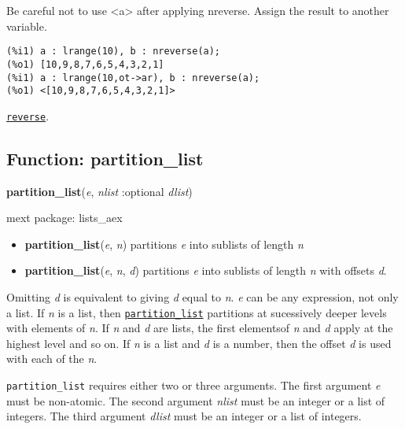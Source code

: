 \documentclass[]{article}
\begin{document}
\vspace{5 pt}


   Be careful not to use <a> after applying nreverse. Assign the result to 
   another variable. 

\begin{Verbatim}[frame=single]
(%i1) a : lrange(10), b : nreverse(a);
(%o1) [10,9,8,7,6,5,4,3,2,1]
(%i1) a : lrange(10,ot->ar), b : nreverse(a);
(%o1) <[10,9,8,7,6,5,4,3,2,1]>
\end{Verbatim}


 \hyperlink{reverse}{{\tt reverse}}.

\vspace{5 pt}


\subsection{Function: partition\_list\label{sec:partition_list}}
\hypertarget{partition_list}{}
{\bf partition\_list}({\it e}, {\it nlist} :optional {\it dlist})


\noindent mext package: lists\_aex



\vspace{5 pt}
\begin{itemize}
\item[] {\bf partition\_list}({\it e}, {\it n})
  partitions {\it e} into sublists of length {\it n} 

\item[] {\bf partition\_list}({\it e}, {\it n}, {\it d})
  partitions {\it e} into sublists of length {\it n} with offsets {\it d}. 

\end{itemize}
Omitting {\it d} is equivalent to giving {\it d} equal to {\it n}. {\it e} can be any expression, not only a list. If {\it n} is a list, then \hyperlink{partition_list}{{\tt partition\_list}} partitions at sucessively deeper levels with elements of {\it n}. If {\it n} and {\it d} are lists, the 
first elementsof {\it n} and {\it d} apply at the highest level and so on. If {\it n} is a list and {\it d} is a number, then the offset {\it d} is used with each of the {\it n}. 

\vspace{5 pt}

   {\tt partition\_list} requires either two or three arguments.
    The first argument {\it e} must be non-atomic.
    The second argument {\it nlist} must be an integer or a list of integers.
    The third argument {\it dlist} must be an integer or a list of integers.
\end{document}

